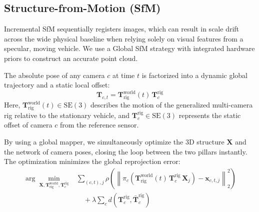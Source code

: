 \documentclass[letterpaper, 10 pt, conference]{ieeeconf}  %
\begin{document}
\subsection{Structure-from-Motion (SfM)}

\label{subsec:methodology_structure_from_motion}





Incremental SfM sequentially registers images, which can result in scale drift across the wide physical baseline when relying solely on visual features from a specular, moving vehicle. We use a Global SfM strategy \cite{pan2024global} with integrated hardware priors to construct an accurate point cloud.

The absolute pose of any camera $c$ at time $t$ is factorized into a dynamic global trajectory and a static local offset:
\begin{equation}
    \mathbf{T}_{c,t} = \mathbf{T}^{\text{world}}_{\text{rig}}(t)\,\mathbf{T}^{\text{rig}}_{c}
    \label{eq:rig_factor}
\end{equation}
Here, $\mathbf{T}^{\text{world}}_{\text{rig}}(t) \in \mathrm{SE}(3)$ describes the motion of the generalized multi-camera rig relative to the stationary vehicle, and $\mathbf{T}^{\text{rig}}_{c} \in \mathrm{SE}(3)$ represents the static offset of camera $c$ from the reference sensor.



By using a global mapper, we simultaneously optimize the 3D structure $\mathbf{X}$ and the network of camera poses, closing the loop between the two pillars instantly. The optimization minimizes the global reprojection error:
\begin{equation}
\begin{aligned}
\arg\min_{\mathbf{X}, \mathbf{T}^{\text{world}}_{\text{rig}}, \mathbf{T}^{\text{rig}}_{c}}
&\sum_{(c,t),j} \rho \!\left(
\left\| \pi_c \!\left( \mathbf{T}^{\text{world}}_{\text{rig}}(t)\, \mathbf{T}^{\text{rig}}_{c}\, \mathbf{X}_j \right)
- \mathbf{x}_{c,t,j} \right\|_2^2
\right) \\
&\quad + \lambda \sum_{c} d \!\left( \mathbf{T}^{\text{rig}}_{c}, \bar{\mathbf{T}}^{\text{rig}}_{c} \right)
\end{aligned}
\end{equation}
\end{document}
